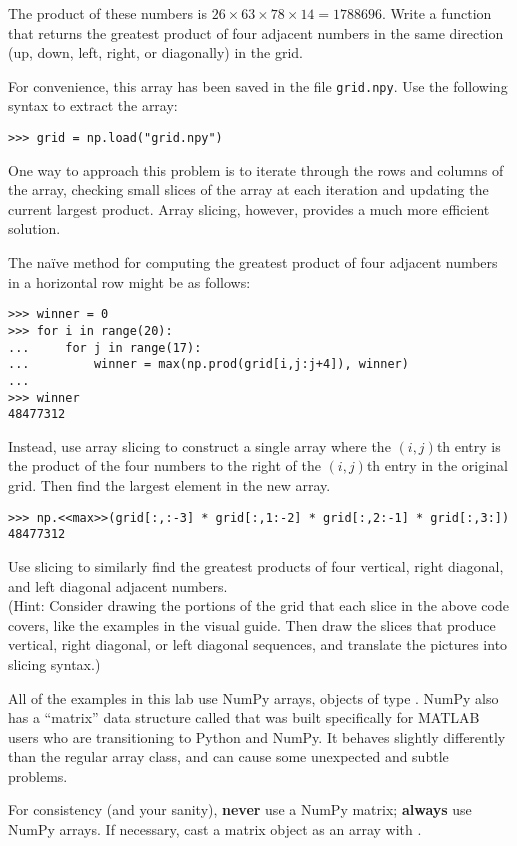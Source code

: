 \begin{problem}
The product of these numbers is $26 \times 63 \times 78 \times 14 = 1788696$.
Write a function that returns the greatest product of four adjacent numbers in the same direction (up, down, left, right, or diagonally) in the grid.

For convenience, this array has been saved in the file \texttt{grid.npy}.
Use the following syntax to extract the array:

\begin{lstlisting}
>>> grid = np.load("grid.npy")
\end{lstlisting}

One way to approach this problem is to iterate through the rows and columns of the array, checking small slices of the array at each iteration and updating the current largest product.
Array slicing, however, provides a much more efficient solution.

The na\"{i}ve method for computing the greatest product of four adjacent numbers in a horizontal row might be as follows:

\begin{lstlisting}
>>> winner = 0
>>> for i in range(20):
...     for j in range(17):
...         winner = max(np.prod(grid[i,j:j+4]), winner)
...
>>> winner
48477312
\end{lstlisting}

Instead, use array slicing to construct a single array where the $(i,j)$th entry is the product of the four numbers to the right of the $(i,j)$th entry in the original grid.
Then find the largest element in the new array.

\begin{lstlisting}
>>> np.<<max>>(grid[:,:-3] * grid[:,1:-2] * grid[:,2:-1] * grid[:,3:])
48477312
\end{lstlisting}

Use slicing to similarly find the greatest products of four vertical, right diagonal, and left diagonal adjacent numbers.
\\
(Hint: Consider drawing the portions of the grid that each slice in the above code covers, like the examples in the visual guide.
Then draw the slices that produce vertical, right diagonal, or left diagonal sequences, and translate the pictures into slicing syntax.)
\end{problem}

\begin{warn}
All of the examples in this lab use NumPy arrays, objects of type .
NumPy also has a ``matrix'' data structure called  that was built specifically for MATLAB users who are transitioning to Python and NumPy.
It behaves slightly differently than the regular array class, and can cause some unexpected and subtle problems.

For consistency (and your sanity), \textbf{never} use a NumPy matrix; \textbf{always} use NumPy arrays.
If necessary, cast a matrix object as an array with .
\end{warn}


